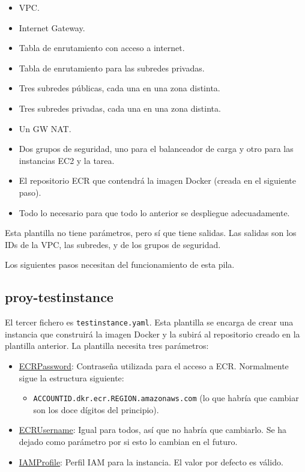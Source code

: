 \begin{itemize}
    \item VPC.
    \item Internet Gateway.
    \item Tabla de enrutamiento con acceso a internet.
    \item Tabla de enrutamiento para las subredes privadas.
    \item Tres subredes públicas, cada una en una zona distinta.
    \item Tres subredes privadas, cada una en una zona distinta.
    \item Un GW NAT.
    \item Dos grupos de seguridad, uno para el balanceador de carga y otro para las instancias EC2 y la tarea.
    \item El repositorio ECR que contendrá la imagen Docker (creada en el siguiente paso).
    \item Todo lo necesario para que todo lo anterior se despliegue adecuadamente.
\end{itemize}

Esta plantilla no tiene parámetros, pero sí que tiene salidas. Las salidas son los IDs de la VPC, las subredes, y de los grupos de seguridad.

Los siguientes pasos necesitan del funcionamiento de esta pila.

\subsection{proy-testinstance}

El tercer fichero es \texttt{testinstance.yaml}. Esta plantilla se encarga de crear una instancia que construirá la imagen Docker y la subirá al repositorio creado en la plantilla anterior. La plantilla necesita tres parámetros:

\begin{itemize}
    \item \underline{ECRPassword}: Contraseña utilizada para el acceso a ECR. Normalmente sigue la estructura siguiente:
    \begin{itemize}
        \item \texttt{ACCOUNTID.dkr.ecr.REGION.amazonaws.com} (lo que habría que cambiar son los doce dígitos del principio).
    \end{itemize}
    \item \underline{ECRUsername}: Igual para todos, así que no habría que cambiarlo. Se ha dejado como parámetro por si esto lo cambian en el futuro.
    \item \underline{IAMProfile}: Perfil IAM para la instancia. El valor por defecto es válido.
\end{itemize}

